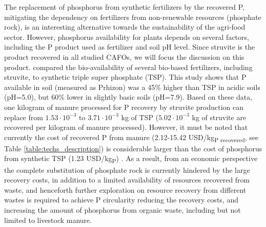 \documentclass[authoryear]{elsarticle}
\begin{document}
The replacement of phosphorus from synthetic fertilizers by the recovered P, mitigating the dependency on fertilizers from non-renewable resources (phosphate rock), is an interesting alternative towards the sustainability of the agri-food sector. However, phosphorus availability for plants depends on several factors, including the P product used as fertilizer and soil pH level. Since struvite is the product recovered in all studied CAFOs, we will focus the discussion on this product.
\citet{vaneeckhaute2015efficiency} compared the bio-availability of several bio-based fertilizers, including struvite, to synthetic triple super phosphate (TSP). This study shows that P available in soil (measured as Prhizon) was a 45\% higher than TSP in acidic soils (pH=5.0), but 60\% lower in slightly basic soils (pH=7.9). Based on these data, one kilogram of manure processed for P recovery by struvite production can replace from $1.53\cdot 10^{-3}$ to $3.71\cdot 10^{-3}$ kg of TSP ($5.02 \cdot 10^{-3}$ kg of struvite are recovered per kilogram of manure processed). However, it must be noted that currently the cost of recovered P from manure (2.12-15.42 USD/kg\textsubscript{P recovered}, see Table \ref{table:techs_description}) is considerable larger than the cost of phosphorus from synthetic TSP (1.23  USD/kg\textsubscript{P}) \citep{fertilizers_price}. As a result, from an economic perspective the complete substitution of phosphate rock is currently hindered by the large recovery costs, in addition to a limited availability of resources recovered from waste, and henceforth further exploration on resource recovery from different wastes is required to achieve P circularity reducing the recovery costs, and increasing the amount of phosphorus from organic waste, including but not limited to livestock manure.

\end{document}
